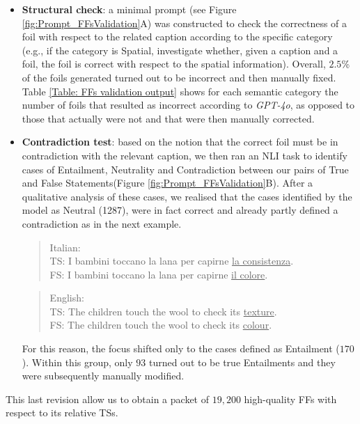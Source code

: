\begin{itemize}
    \item \textbf{Structural check}: a minimal prompt (see Figure \ref{fig:Prompt_FFsValidation}A) was constructed to check the correctness of a foil with respect to the related caption according to the specific category (e.g., if the category is Spatial, investigate whether, given a caption and a foil, the foil is correct with respect to the spatial information). Overall, $2.5$\% of the foils generated turned out to be incorrect and then manually fixed. Table \ref{Table: FFs validation output} shows for each semantic category the number of foils that resulted as incorrect according to \textit{GPT-4o}, as opposed to those that actually were not and that were then manually corrected. 
    \item \textbf{Contradiction test}: based on the notion that the correct foil must be in contradiction with the relevant caption, we then ran an NLI task to identify cases of Entailment, Neutrality and Contradiction between our pairs of True and False Statements(Figure \ref{fig:Prompt_FFsValidation}B). After a qualitative analysis of these cases, we realised that the cases identified by the model as Neutral (1287), were in fact correct and already partly defined a contradiction as in the next example.

\begin{quote}
    Italian:\\
        TS: I bambini toccano la lana per capirne \underline{la consistenza}.\\
        FS: I bambini toccano la lana per capirne \underline{il colore}.
    \end{quote}

   \begin{quote}
    English:\\
        TS: The children touch the wool to check its \underline{texture}.\\
        FS: The children touch the wool to check its \underline{colour}.
    \end{quote}


For this reason, the focus shifted only to the cases defined as Entailment ($170$). Within this group, only $93$ turned out to be true Entailments and they were subsequently manually modified. 
\end{itemize}
This last revision allow us to obtain a packet of $19,200$ high-quality FFs with respect to its relative TSs.
